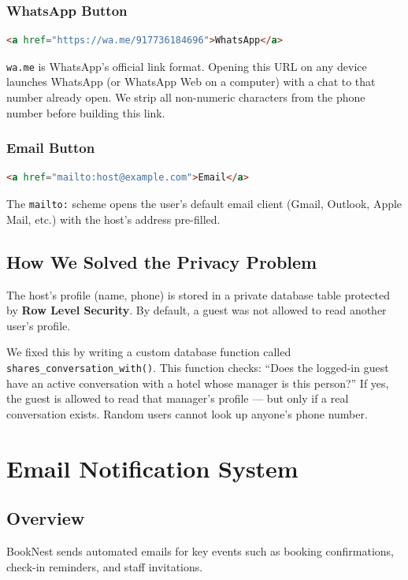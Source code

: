 \documentclass[12pt,a4paper]{article}
\begin{document}
\subsubsection{WhatsApp Button}
\begin{lstlisting}[language=HTML, caption=WhatsApp Deep Link]
<a href="https://wa.me/917736184696">WhatsApp</a>
\end{lstlisting}
\texttt{wa.me} is WhatsApp's official link format. Opening this URL on any device launches WhatsApp (or WhatsApp Web on a computer) with a chat to that number already open. We strip all non-numeric characters from the phone number before building this link.

\subsubsection{Email Button}
\begin{lstlisting}[language=HTML, caption=Email Mailto Link]
<a href="mailto:host@example.com">Email</a>
\end{lstlisting}
The \texttt{mailto:} scheme opens the user's default email client (Gmail, Outlook, Apple Mail, etc.) with the host's address pre-filled.

\subsection{How We Solved the Privacy Problem}
The host's profile (name, phone) is stored in a private database table protected by \textbf{Row Level Security}. By default, a guest was not allowed to read another user's profile.

We fixed this by writing a custom database function called \texttt{shares\_conversation\_with()}. This function checks: ``Does the logged-in guest have an active conversation with a hotel whose manager is this person?'' If yes, the guest is allowed to read that manager's profile --- but only if a real conversation exists. Random users cannot look up anyone's phone number.

\newpage
\section{Email Notification System}

\subsection{Overview}
BookNest sends automated emails for key events such as booking confirmations, check-in reminders, and staff invitations.
\end{document}
